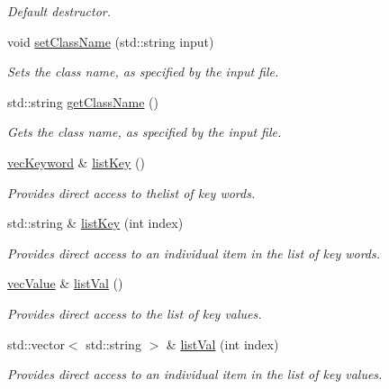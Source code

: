 \begin{DoxyCompactItemize}
\begin{DoxyCompactList}\small\item\em Default destructor. \end{DoxyCompactList}\item 
void \hyperlink{classosea_1_1_object_group_afe112da71222da5ed206dc81636b3ca7}{set\-Class\-Name} (std\-::string input)
\begin{DoxyCompactList}\small\item\em Sets the class name, as specified by the input file. \end{DoxyCompactList}\item 
std\-::string \hyperlink{classosea_1_1_object_group_aa158e9516621ab6e2b690bad6c6619b5}{get\-Class\-Name} ()
\begin{DoxyCompactList}\small\item\em Gets the class name, as specified by the input file. \end{DoxyCompactList}\item 
\hyperlink{namespaceosea_af47d453cb217c2c461685cd6e754c070}{vec\-Keyword} \& \hyperlink{classosea_1_1_object_group_a0f44d28c868ba60971af1a7aceb2e5bd}{list\-Key} ()
\begin{DoxyCompactList}\small\item\em Provides direct access to thelist of key words. \end{DoxyCompactList}\item 
std\-::string \& \hyperlink{classosea_1_1_object_group_a4b52a556b4404a1d13d50d0a3808eec2}{list\-Key} (int index)
\begin{DoxyCompactList}\small\item\em Provides direct access to an individual item in the list of key words. \end{DoxyCompactList}\item 
\hyperlink{namespaceosea_ae7c5f2bab0fab3931b2ef51a0ad04cc2}{vec\-Value} \& \hyperlink{classosea_1_1_object_group_a6c3064de310a852551d438a5f31f987f}{list\-Val} ()
\begin{DoxyCompactList}\small\item\em Provides direct access to the list of key values. \end{DoxyCompactList}\item 
std\-::vector$<$ std\-::string $>$ \& \hyperlink{classosea_1_1_object_group_af23637baa7d1b46b34dcb5e5de4b68bd}{list\-Val} (int index)
\begin{DoxyCompactList}\small\item\em Provides direct access to an individual item in the list of key values. \end{DoxyCompactList}\item 

\end{DoxyCompactItemize}
